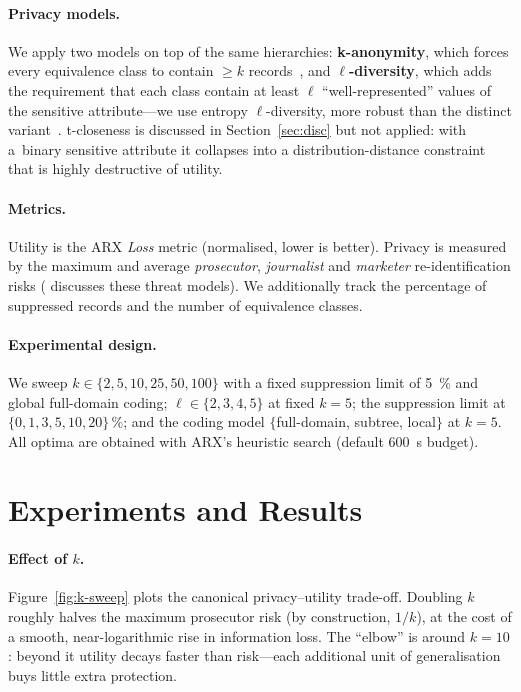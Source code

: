 \documentclass[a4paper,10pt]{article}
\begin{document}
\paragraph{Privacy models.}
We apply two models on top of the same hierarchies:
\textbf{k-anonymity}, which forces every equivalence class to contain
$\geq k$ records~\cite{sweeney2002k}, and \textbf{$\ell$-diversity},
which adds the requirement that each class contain at least $\ell$
``well-represented'' values of the sensitive attribute---we use
entropy $\ell$-diversity, more robust than the distinct
variant~\cite{machanavajjhala2007ldiversity}. t-closeness
\cite{li2007tcloseness} is discussed in Section~\ref{sec:disc} but not
applied: with a~binary sensitive attribute it collapses into a
distribution-distance constraint that is highly destructive of
utility.

\paragraph{Metrics.}
Utility is the ARX \emph{Loss} metric (normalised, lower is better).
Privacy is measured by the maximum and average \emph{prosecutor},
\emph{journalist} and \emph{marketer} re-identification risks
(\cite{elemam2011quantifying} discusses these threat models). We
additionally track the percentage of suppressed records and the
number of equivalence classes.

\paragraph{Experimental design.}
We sweep $k \in \{2,5,10,25,50,100\}$ with a fixed suppression limit
of \SI{5}{\percent} and global full-domain coding;
$\ell \in \{2,3,4,5\}$ at fixed $k{=}5$; the suppression limit at
$\{0,1,3,5,10,20\}\,\%$; and the coding model
$\{$full-domain, subtree, local$\}$ at $k{=}5$. All optima are obtained
with ARX's heuristic search (default \SI{600}{\second} budget).

\section{Experiments and Results}
\label{sec:results}

\paragraph{Effect of $k$.}
Figure~\ref{fig:k-sweep} plots the canonical privacy--utility
trade-off. Doubling $k$ roughly halves the maximum prosecutor risk
(by construction, $1/k$), at the cost of a smooth, near-logarithmic
rise in information loss. The ``elbow'' is around $k{=}10$:
beyond it utility decays faster than risk---each additional unit of
generalisation buys little extra protection.
\end{document}
